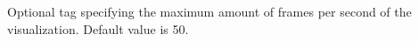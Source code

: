 Optional tag specifying the maximum amount of frames per second of the visualization. Default value is 50. 